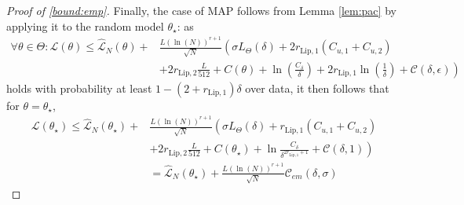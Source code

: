\documentclass{article}
\begin{document}
\begin{proof}[Proof of \eqref{bound:emp}]
    Finally, the case of MAP follows from Lemma \ref{lem:pac} by applying it to the random model $\theta_{\star}$:
    as  
    \[
    \begin{aligned}
     \forall \theta \in \Theta: 
    \mathcal{L}(\theta) \le 
    \hat{\mathcal{L}}_{N}(\theta) + &
     \frac{L(\ln(N))^{r+1}}{\sqrt{N}} \left(
       \sigma L_{\Theta}(\delta) +  2r_{\text{Lip},1} \left(C_{u,1}+C_{u,2}\right) \right. \\
       & \left. +2r_{\text{Lip},2}\frac{L}{512} 
     +C(\theta)+\ln(\frac{C_{\delta}}{\delta})+ 2r_{\text{Lip},1}\ln(\frac{1}{\delta}) + \mathcal{C}(\delta,\epsilon)\right) 
    \end{aligned}
    \]
    holds with probability at least $1-(2+r_{\text{Lip},1})\delta$ over data, it then follows that 
    for $\theta=\theta_{\star}$, 
    \[
    \begin{aligned}
    \mathcal{L}(\theta_{\star}) \le 
    \hat{\mathcal{L}}_{N}(\theta_{\star}) + &
     \frac{L(\ln(N))^{r+1}}{\sqrt{N}} \left(
       \sigma L_{\Theta}(\delta) +  r_{\text{Lip},1} \left(C_{u,1}+C_{u,2}\right) \right. \\
       & \left. +2r_{\text{Lip},2}\frac{L}{512} 
     +C(\theta_{\star})+\ln\frac{C_{\delta}}{\delta^{2r_{\text{Lip},1}+1}} + \mathcal{C}(\delta,1)\right) \\
     & = \hat{\mathcal{L}}_{N}(\theta_{\star}) + 
     \frac{L(\ln(N))^{r+1}}{\sqrt{N}} \mathcal{C}_{em}(\delta,\sigma)
    \end{aligned}
    \]
% 
\end{proof}
\end{document}
